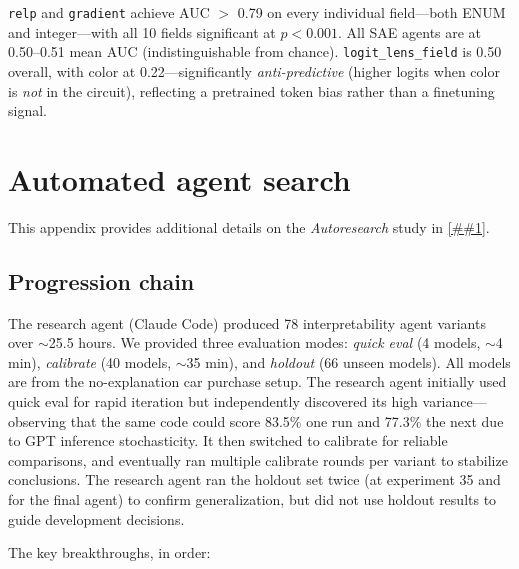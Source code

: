 \documentclass{article} %
\newcommand{\Cref}[1]{\ref{##1}}
\begin{document}
\texttt{relp} and \texttt{gradient} achieve AUC $>$ 0.79 on every individual field---both ENUM and integer---with all 10 fields significant at $p < 0.001$.
All SAE agents are at 0.50--0.51 mean AUC (indistinguishable from chance).
\texttt{logit\_lens\_field} is 0.50 overall, with color at 0.22---significantly \emph{anti-predictive} (higher logits when color is \emph{not} in the circuit), reflecting a pretrained token bias rather than a finetuning signal.

\section{Automated agent search}
\label{app:agent_search}

This appendix provides additional details on the \emph{Autoresearch} study in \Cref{sec:agent_search}.

\subsection{Progression chain}

The research agent (Claude Code) produced 78 interpretability agent variants over ${\sim}$25.5 hours.
We provided three evaluation modes: \emph{quick eval} (4 models, ${\sim}$4 min), \emph{calibrate} (40 models, ${\sim}$35 min), and \emph{holdout} (66 unseen models). All models are from the no-explanation car purchase setup.
The research agent initially used quick eval for rapid iteration but independently discovered its high variance---observing that the same code could score 83.5\% one run and 77.3\% the next due to GPT inference stochasticity.
It then switched to calibrate for reliable comparisons, and eventually ran multiple calibrate rounds per variant to stabilize conclusions.
The research agent ran the holdout set twice (at experiment 35 and for the final agent) to confirm generalization, but did not use holdout results to guide development decisions.

The key breakthroughs, in order:
\end{document}
